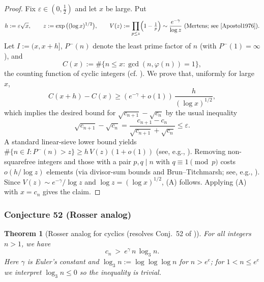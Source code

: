 \documentclass[12pt]{article}
\renewcommand{\tag}[1]{}
\newtheorem{theorem}{Theorem}
\theoremstyle{remark}
\begin{document}
\begin{proof}
Fix $\varepsilon\in(0,\tfrac12)$ and let $x$ be large. Put
$$
 h:=\varepsilon\sqrt x,\qquad z:=\exp\big((\log x)^{1/2}\big),\qquad V(z):=\prod_{p\le z}\Bigl(1-\tfrac1p\Bigr)\sim\frac{e^{-\gamma}}{\log z}\ \text{(Mertens; see \cite{Apostol1976}).}
$$
Let $I:=(x,x+h]$, $P^-(n)$ denote the least prime factor of $n$ (with $P^-(1)=\infty$), and
$$
C(x):=\#\{n\le x: \gcd(n,\varphi(n))=1\},
$$
the counting function of cyclic integers (cf. \cite{Pollack2022}). We prove that, uniformly for large $x$,
$$
C(x+h)-C(x)\ge (e^{-\gamma}+o(1))\,\frac{h}{(\log x)^{1/2}},\tag{A}
$$
which implies the desired bound for $\sqrt{c_{n+1}}-\sqrt{c_n}$ by the usual inequality
$$
\sqrt{c_{n+1}}-\sqrt{c_n}=\frac{c_{n+1}-c_n}{\sqrt{c_{n+1}}+\sqrt{c_n}}\le \varepsilon.
$$
A standard linear-sieve lower bound yields $\#\{n\in I:P^-(n)>z\}\ge h\,V(z)(1+o(1))$ (see, e.g., \cite{HalRich1974,IK2004}). Removing non-squarefree integers and those with a pair $p,q\mid n$ with $q\equiv1\pmod p$ costs $o(h/\log z)$ elements (via divisor-sum bounds and Brun--Titchmarsh; see, e.g., \cite{MV2007,IK2004}). Since $V(z)\sim e^{-\gamma}/\log z$ and $\log z=(\log x)^{1/2}$, (A) follows. Applying (A) with $x=c_n$ gives the claim.
\end{proof}


\subsubsection{Conjecture 52 (Rosser analog)}
\begin{theorem}[Rosser analog for cyclics (resolves Conj.~52 of \cite{Cohen2025})]\label{thm:rosser}
For all integers $n>1$, we have
\[
 c_n\ >\ e^{\gamma}\,n\,\log_3 n.
\]
Here $\gamma$ is Euler's constant and $\log_3 n := \log\log\log n$ for $n>e^e$; for $1<n\le e^e$ we interpret $\log_3 n\le0$ so the inequality is trivial.
\end{theorem}
\end{document}
